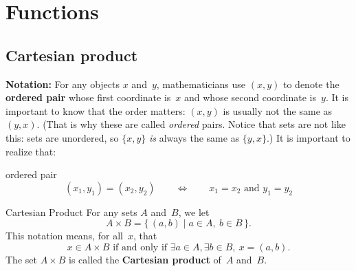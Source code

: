 \documentclass[../MATH-2000-Notes.tex]{subfiles}
\begin{document}
\chapter{Functions}
\section{Cartesian product}
\textbf{Notation:}
For any objects $x$ and~$y$, mathematicians use $(x,y)$ to denote the \textbf{ordered pair} whose first coordinate is~$x$ and whose second coordinate is~$y$. It is important to know that the order matters: $(x,y)$ is usually not the same as $(y,x)$. (That is why these are called \emph{ordered} pairs. Notice that sets are not like this: sets are unordered, so $\{x,y\}$ \emph{is} always the same as $\{y,x\}$.) It is important to realize that:
\begin{paperbox}{ordered pair}
    $$(x_1,y_1) = (x_2,y_2) \qquad \Leftrightarrow \qquad \text{$x_1 = x_2$ and $y_1 = y_2$}$$
\end{paperbox}
\begin{Definition}
    {Cartesian Product}
    For any sets $A$ and~$B$, we let
    $$ A \times B = \{\, (a,b) \mid a \in A, \ b \in B \,\}
        .$$
    This notation means, for all~$x$, that
    $$ \text{$x \in A \times B$ if and only if $\exists a \in A, \exists b \in B, \ x = (a,b)$.} $$
    The set $A \times B$ is called the \textbf{Cartesian product} of~$A$ and~$B$.
\end{Definition}
\end{document}
